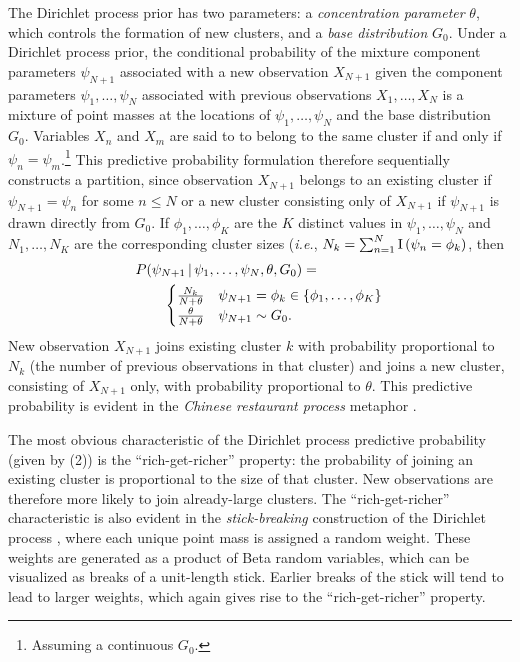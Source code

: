 \documentclass[twoside]{article}
\begin{document}
The Dirichlet process prior has two parameters: a \emph{concentration
  parameter} $\theta$, which controls the formation of new clusters,
and a \emph{base distribution} $G_0$. Under a Dirichlet process prior,
the conditional probability of the mixture component parameters
$\psi_{N+1}$ associated with a new observation $X_{N+1}$ given the
component parameters $\psi_1, \ldots, \psi_N$ associated with previous
observations $X_1, \ldots, X_N$ is a mixture of point masses at the
locations of $\psi_1, \ldots, \psi_N$ and the base distribution
$G_0$. Variables $X_n$ and $X_m$ are said to to belong to the same
cluster if and only if $\psi_n = \psi_m$.\footnote{Assuming a
  continuous $G_0$.} This predictive probability formulation therefore
sequentially constructs a partition, since observation $X_{N+1}$
belongs to an existing cluster if $\psi_{N + 1} = \psi_n$ for some $n
\leq N$ or a new cluster consisting only of $X_{N+1}$ if $\psi_{N+1}$
is drawn directly from $G_0$. If $\phi_1, \ldots, \phi_K$ are the $K$
distinct values in $\psi_1, \ldots, \psi_N$ and $N_1, \ldots, N_K$ are
the corresponding cluster sizes (\emph{i.e.}, $N_k = \sum_{n=1}^N {\rm
  I}\, (\psi_n = \phi_k)$, then
\begin{align}
&P(\psi_{N+1} \,|\, \psi_1, \ldots,\psi_{N}, \theta, G_0) = \notag\\
&\qquad \begin{cases}
\frac{N_k}{N + \theta} & \psi_{N + 1} = \phi_k \in \{ \phi_1, \ldots, \phi_K \}\\
\frac{\theta}{N + \theta} & \psi_{N + 1} \sim G_0.
\end{cases}
\label{DPrule}
\end{align}
New observation $X_{N+1}$ joins existing cluster $k$ with probability
proportional to $N_k$ (the number of previous observations in that
cluster) and joins a new cluster, consisting of $X_{N+1}$ only, with
probability proportional to $\theta$. This predictive probability is
evident in the \emph{Chinese restaurant process} metaphor
\cite[]{aldous85exchangeability}.

The most obvious characteristic of the Dirichlet process predictive
probability (given by (2)) is the ``rich-get-richer'' property: the
probability of joining an existing cluster is proportional to the size
of that cluster. New observations are therefore more likely to join
already-large clusters. The ``rich-get-richer'' characteristic is also
evident in the \emph{stick-breaking} construction of the Dirichlet
process \cite[]{Set94,IshJam01}, where each unique point mass is
assigned a random weight. These weights are generated as a product of
Beta random variables, which can be visualized as breaks of a
unit-length stick. Earlier breaks of the stick will tend to lead to
larger weights, which again gives rise to the ``rich-get-richer''
property.
\end{document}
